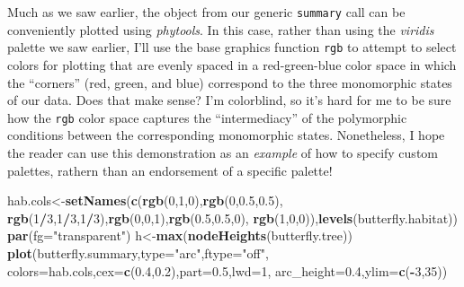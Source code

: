 \documentclass[fleqn,10pt,lineno]{wlpeerj} %
\newenvironment{Shaded}{\begin{snugshade}}{\end{snugshade}}
\newcommand{\AttributeTok}[1]{\textcolor[rgb]{0.13,0.29,0.53}{#1}}
\newcommand{\DecValTok}[1]{\textcolor[rgb]{0.00,0.00,0.81}{#1}}
\newcommand{\FloatTok}[1]{\textcolor[rgb]{0.00,0.00,0.81}{#1}}
\newcommand{\FunctionTok}[1]{\textcolor[rgb]{0.13,0.29,0.53}{\textbf{#1}}}
\newcommand{\NormalTok}[1]{#1}
\newcommand{\OtherTok}[1]{\textcolor[rgb]{0.56,0.35,0.01}{#1}}
\newcommand{\SpecialCharTok}[1]{\textcolor[rgb]{0.81,0.36,0.00}{\textbf{#1}}}
\newcommand{\StringTok}[1]{\textcolor[rgb]{0.31,0.60,0.02}{#1}}
\begin{document}
Much as we saw earlier, the object from our generic \texttt{summary} call can be conveniently plotted using \emph{phytools}. In this case, rather than using the \emph{viridis} palette we saw earlier, I'll use the base graphics function \texttt{rgb} to attempt to select colors for plotting that are evenly spaced in a red-green-blue color space in which the ``corners'' (red, green, and blue) correspond to the three monomorphic states of our data. Does that make sense? I'm colorblind, so it's hard for me to be sure how the \texttt{rgb} color space captures the ``intermediacy'' of the polymorphic conditions between the corresponding monomorphic states. Nonetheless, I hope the reader can use this demonstration as an \emph{example} of how to specify custom palettes, rathern than an endorsement of a specific palette!

\begin{Shaded}
\begin{Highlighting}[]
\NormalTok{hab.cols}\OtherTok{\textless{}{-}}\FunctionTok{setNames}\NormalTok{(}\FunctionTok{c}\NormalTok{(}\FunctionTok{rgb}\NormalTok{(}\DecValTok{0}\NormalTok{,}\DecValTok{1}\NormalTok{,}\DecValTok{0}\NormalTok{),}\FunctionTok{rgb}\NormalTok{(}\DecValTok{0}\NormalTok{,}\FloatTok{0.5}\NormalTok{,}\FloatTok{0.5}\NormalTok{),}
  \FunctionTok{rgb}\NormalTok{(}\DecValTok{1}\SpecialCharTok{/}\DecValTok{3}\NormalTok{,}\DecValTok{1}\SpecialCharTok{/}\DecValTok{3}\NormalTok{,}\DecValTok{1}\SpecialCharTok{/}\DecValTok{3}\NormalTok{),}\FunctionTok{rgb}\NormalTok{(}\DecValTok{0}\NormalTok{,}\DecValTok{0}\NormalTok{,}\DecValTok{1}\NormalTok{),}\FunctionTok{rgb}\NormalTok{(}\FloatTok{0.5}\NormalTok{,}\FloatTok{0.5}\NormalTok{,}\DecValTok{0}\NormalTok{),}
  \FunctionTok{rgb}\NormalTok{(}\DecValTok{1}\NormalTok{,}\DecValTok{0}\NormalTok{,}\DecValTok{0}\NormalTok{)),}\FunctionTok{levels}\NormalTok{(butterfly.habitat))}
\FunctionTok{par}\NormalTok{(}\AttributeTok{fg=}\StringTok{"transparent"}\NormalTok{)}
\NormalTok{h}\OtherTok{\textless{}{-}}\FunctionTok{max}\NormalTok{(}\FunctionTok{nodeHeights}\NormalTok{(butterfly.tree))}
\FunctionTok{plot}\NormalTok{(butterfly.summary,}\AttributeTok{type=}\StringTok{"arc"}\NormalTok{,}\AttributeTok{ftype=}\StringTok{"off"}\NormalTok{,}
  \AttributeTok{colors=}\NormalTok{hab.cols,}\AttributeTok{cex=}\FunctionTok{c}\NormalTok{(}\FloatTok{0.4}\NormalTok{,}\FloatTok{0.2}\NormalTok{),}\AttributeTok{part=}\FloatTok{0.5}\NormalTok{,}\AttributeTok{lwd=}\DecValTok{1}\NormalTok{,}
  \AttributeTok{arc\_height=}\FloatTok{0.4}\NormalTok{,}\AttributeTok{ylim=}\FunctionTok{c}\NormalTok{(}\SpecialCharTok{{-}}\DecValTok{3}\NormalTok{,}\DecValTok{35}\NormalTok{))}

\end{Highlighting}
\end{Shaded}
\end{document}
